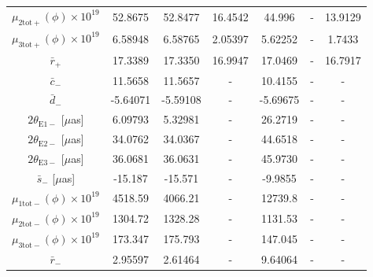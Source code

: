 \documentclass[11pt]{article}
\begin{document}
\begin{table}[htbp]
{\begin{tabular}{c ||c| c| c ||c |c |c}
 $\mu_{2\mathrm{tot}+} (\phi) \times 10^{19}$ &52.8675        &52.8477                     &16.4542                        &44.996                &-                                &13.9129           \\ 
 $\mu_{3\mathrm{tot}+} (\phi) \times 10^{19}$ &6.58948        &6.58765                     &2.05397                        &5.62252               &-                                &1.7433            \\ 
 $\bar{r}_+$		                    &17.3389          &17.3350                     &16.9947                        &17.0469               &-                                &16.7917           \\ \hline
 $\bar{c}_-$                                &11.5658          &11.5657                     &-                              &10.4155               &-                                &-                 \\ 
 $\bar{d}_-$                                &-5.64071         &-5.59108                    &-                              &-5.69675              &-                                &-                 \\ 
 $2\theta_{\mathrm{E}1-}$ [$\mu$as]         &6.09793          &5.32981                     &-                              &26.2719               &-                                &-                 \\ 
 $2\theta_{\mathrm{E}2-}$ [$\mu$as]         &34.0762          &34.0367                     &-                              &44.6518               &-                                &-                 \\ 
 $2\theta_{\mathrm{E}3-}$ [$\mu$as]         &36.0681          &36.0631                     &-                              &45.9730               &-                                &-                 \\ 
 $\bar{s}_-$ [$\mu$as]                      &-15.187          &-15.571                     &-                              &-9.9855               &-                                &-                 \\ 
 $\mu_{1\mathrm{tot}-} (\phi) \times 10^{19}$ &4518.59        &4066.21                     &-                              &12739.8               &-                                &-                 \\ 
 $\mu_{2\mathrm{tot}-} (\phi) \times 10^{19}$ &1304.72        &1328.28                     &-                              &1131.53               &-                                &-                 \\ 
 $\mu_{3\mathrm{tot}-} (\phi) \times 10^{19}$ &173.347        &175.793                     &-                              &147.045               &-                                &-                 \\ 
 $\bar{r}_-$		                    &2.95597          &2.61464                     &-                              &9.64064               &-                                &-                 \\ \hline
\end{tabular}
}
\end{table}
\end{document}
